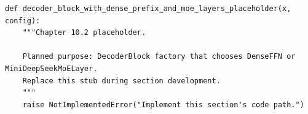 \begin{lstlisting}[style=bookpython,caption={Planned code placeholder for decoder block with dense prefix and MoE layers.},label={lst:ch10-decoder-block-with-dense-prefix-and-moe-layers}]
def decoder_block_with_dense_prefix_and_moe_layers_placeholder(x, config):
    """Chapter 10.2 placeholder.

    Planned purpose: DecoderBlock factory that chooses DenseFFN or MiniDeepSeekMoELayer.
    Replace this stub during section development.
    """
    raise NotImplementedError("Implement this section's code path.")
\end{lstlisting}
